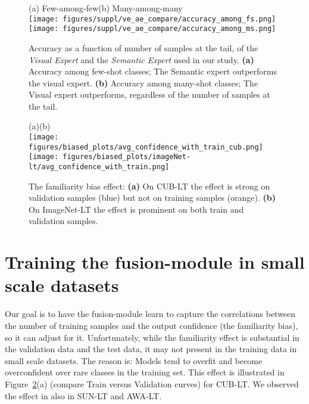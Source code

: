 \documentclass[10pt,twocolumn,letterpaper]{article}
\newcommand{\figref}[1]{Figure~\ref{#1}}
\begin{document}
\begin{figure}[t!]
    \centering
    (a) Few-among-few\hspace{20pt}(b) Many-among-many \\
    \texttt{[image: figures/suppl/ve\_ae\_compare/accuracy\_among\_fs.png]}
    \texttt{[image: figures/suppl/ve\_ae\_compare/accuracy\_among\_ms.png]}
    \caption{Accuracy as a function of number of samples at the tail, of the \textit{Visual Expert} and the \textit{Semantic Expert} used in our study.
    \textbf{(a)} Accuracy among few-shot classes; The Semantic expert outperforms the visual expert.
    \textbf{(b)} Accuracy among many-shot classes; The Visual expert outperforms, regardless of the number of samples at the tail. 
    }
    \label{fig:ve_vs_ae}
\end{figure}


















\begin{figure}
    \centering
    (a)\hspace{100pt}(b) \\
    \texttt{[image: figures/biased\_plots/avg\_confidence\_with\_train\_cub.png]}
    \texttt{[image: figures/biased\_plots/imageNet-lt/avg\_confidence\_with\_train.png]}
    \caption{The familiarity bias effect: \textbf{(a)} On CUB-LT the effect is strong on validation samples (blue) but not on training samples (orange). \textbf{(b)} On ImageNet-LT the effect is prominent on both train and validation samples.  }
    \label{fig:train_vs_val_bias}
\end{figure}

\section{Training the fusion-module in small scale datasets}
\label{sec:training-fusion-module}
Our goal is to have the fusion-module learn to capture the correlations between the number of training samples and the output confidence (the familiarity bias), so it can adjust for it. 
Unfortunately, while the familiarity effect is substantial in the validation data and the test data, it may not present in the training data in small scale datasets.
The reason is: Models tend to overfit and become overconfident over rare classes in the training set. 
This effect is illustrated in \figref{fig:train_vs_val_bias}(a) (compare Train versus Validation curves) for CUB-LT. We  observed the effect in also in SUN-LT and AWA-LT. 
\end{document}
